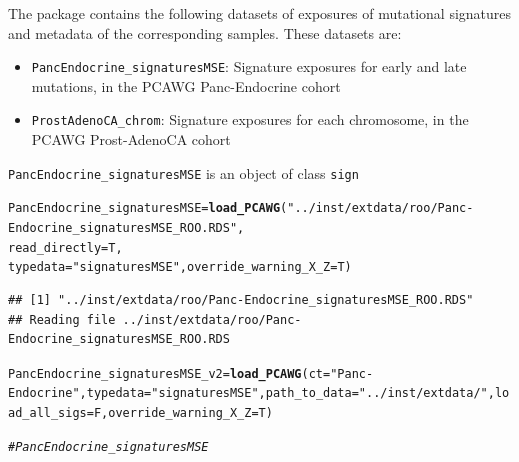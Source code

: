 \documentclass{article}\usepackage[]{graphicx}\usepackage[]{xcolor}
\makeatletter
\newcommand{\hlstr}[1]{\textcolor[rgb]{0.192,0.494,0.8}{#1}}%
\newcommand{\hlcom}[1]{\textcolor[rgb]{0.678,0.584,0.686}{\textit{#1}}}%
\newcommand{\hlstd}[1]{\textcolor[rgb]{0.345,0.345,0.345}{#1}}%
\newcommand{\hlkwb}[1]{\textcolor[rgb]{0.69,0.353,0.396}{#1}}%
\newcommand{\hlkwc}[1]{\textcolor[rgb]{0.333,0.667,0.333}{#1}}%
\newcommand{\hlkwd}[1]{\textcolor[rgb]{0.737,0.353,0.396}{\textbf{#1}}}%
\newenvironment{kframe}{%
 \def\at@end@of@kframe{}%
 \ifinner\ifhmode%
  \def\at@end@of@kframe{\end{minipage}}%
  \begin{minipage}{\columnwidth}%
 \fi\fi%
 \def\FrameCommand##1{\hskip\@totalleftmargin \hskip-\fboxsep
 \colorbox{shadecolor}{##1}\hskip-\fboxsep
     \hskip-\linewidth \hskip-\@totalleftmargin \hskip\columnwidth}%
 \MakeFramed {\advance\hsize-\width
   \@totalleftmargin\z@ \linewidth\hsize
   \@setminipage}}%
 {\par\unskip\endMakeFramed%
 \at@end@of@kframe}
\newenvironment{knitrout}{}{} %
\makeatother
\begin{document}
The package contains the following datasets of exposures of mutational signatures and metadata of the corresponding samples. These datasets are:
\begin{itemize}
\item \verb|PancEndocrine_signaturesMSE|: Signature exposures for early and late mutations, in the PCAWG Panc-Endocrine cohort
\item  \verb|ProstAdenoCA_chrom|: Signature exposures for each chromosome, in the PCAWG Prost-AdenoCA cohort
\end{itemize}

\verb|PancEndocrine_signaturesMSE| is an object of class \verb|sign|

\begin{knitrout}
\color{fgcolor}\begin{kframe}
\begin{alltt}
\hlstd{PancEndocrine_signaturesMSE} \hlkwb{=} \hlkwd{load_PCAWG}\hlstd{(}\hlstr{"../inst/extdata/roo/Panc-Endocrine_signaturesMSE_ROO.RDS"}\hlstd{,}
                                         \hlkwc{read_directly} \hlstd{= T,}
                                         \hlkwc{typedata} \hlstd{=} \hlstr{"signaturesMSE"}\hlstd{,} \hlkwc{override_warning_X_Z} \hlstd{= T)}
\end{alltt}
\begin{verbatim}
## [1] "../inst/extdata/roo/Panc-Endocrine_signaturesMSE_ROO.RDS"
## Reading file ../inst/extdata/roo/Panc-Endocrine_signaturesMSE_ROO.RDS
\end{verbatim}
\begin{alltt}
\hlstd{PancEndocrine_signaturesMSE_v2} \hlkwb{=} \hlkwd{load_PCAWG}\hlstd{(}\hlkwc{ct} \hlstd{=} \hlstr{"Panc-Endocrine"}\hlstd{,} \hlkwc{typedata} \hlstd{=} \hlstr{"signaturesMSE"}\hlstd{,} \hlkwc{path_to_data} \hlstd{=} \hlstr{"../inst/extdata/"}\hlstd{,} \hlkwc{load_all_sigs} \hlstd{= F,} \hlkwc{override_warning_X_Z} \hlstd{= T)}
\end{alltt}
\end{kframe}
\end{knitrout}

\begin{knitrout}
\color{fgcolor}\begin{kframe}
\begin{alltt}
\hlcom{# PancEndocrine_signaturesMSE}
\end{alltt}
\end{kframe}
\end{knitrout}
\end{document}

